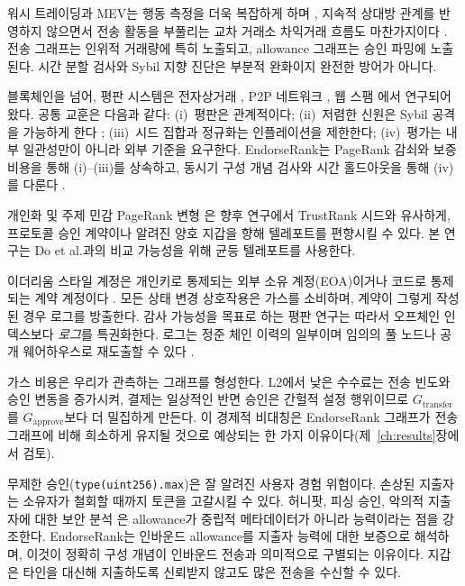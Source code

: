 워시 트레이딩과 MEV는 행동 측정을 더욱 복잡하게 하며 , 지속적 상대방 관계를 반영하지 않으면서 전송 활동을 부풀리는 교차 거래소 차익거래 흐름도 마찬가지이다 . 전송 그래프는 인위적 거래량에 특히 노출되고, allowance 그래프는 승인 파밍에 노출된다. 시간 분할 검사와 Sybil 지향 진단은 부분적 완화이지 완전한 방어가 아니다.


블록체인을 넘어, 평판 시스템은 전자상거래 , P2P 네트워크 , 웹 스팸 에서 연구되어 왔다. 공통 교훈은 다음과 같다: (i)~평판은 관계적이다; (ii)~저렴한 신원은 Sybil 공격을 가능하게 한다 ; (iii)~시드 집합과 정규화는 인플레이션을 제한한다; (iv)~평가는 내부 일관성만이 아니라 외부 기준을 요구한다. EndorseRank는 PageRank 감쇠와 보증 비용을 통해 (i)--(iii)를 상속하고, 동시기 구성 개념 검사와 시간 홀드아웃을 통해 (iv)를 다룬다 .

개인화 및 주제 민감 PageRank 변형 은 향후 연구에서 TrustRank 시드와 유사하게, 프로토콜 승인 계약이나 알려진 양호 지갑을 향해 텔레포트를 편향시킬 수 있다. 본 연구는 Do et al.과의 비교 가능성을 위해 균등 텔레포트를 사용한다.


이더리움 스타일 계정은 개인키로 통제되는 외부 소유 계정(EOA)이거나 코드로 통제되는 계약 계정이다 . 모든 상태 변경 상호작용은 가스를 소비하며, 계약이 그렇게 작성된 경우 로그를 방출한다. 감사 가능성을 목표로 하는 평판 연구는 따라서 오프체인 인덱스보다 \emph{로그}를 특권화한다. 로그는 정준 체인 이력의 일부이며 임의의 풀 노드나 공개 웨어하우스로 재도출할 수 있다 .

가스 비용은 우리가 관측하는 그래프를 형성한다. L2에서 낮은 수수료는 전송 빈도와 승인 변동을 증가시켜, 결제는 일상적인 반면 승인은 간헐적 설정 행위이므로 $G_{\text{transfer}}$를 $G_{\text{approve}}$보다 더 밀집하게 만든다. 이 경제적 비대칭은 EndorseRank 그래프가 전송 그래프에 비해 희소하게 유지될 것으로 예상되는 한 가지 이유이다(제~\ref{ch:results}장에서 검토).


무제한 승인(\texttt{type(uint256).max})은 잘 알려진 사용자 경험 위험이다. 손상된 지출자는 소유자가 철회할 때까지 토큰을 고갈시킬 수 있다. 허니팟, 피싱 승인, 악의적 지출자에 대한 보안 분석 은 allowance가 중립적 메타데이터가 아니라 능력이라는 점을 강조한다. EndorseRank는 인바운드 allowance를 지출자 능력에 대한 보증으로 해석하며, 이것이 정확히 구성 개념이 인바운드 전송과 의미적으로 구별되는 이유이다. 지갑은 타인을 대신해 지출하도록 신뢰받지 않고도 많은 전송을 수신할 수 있다.

